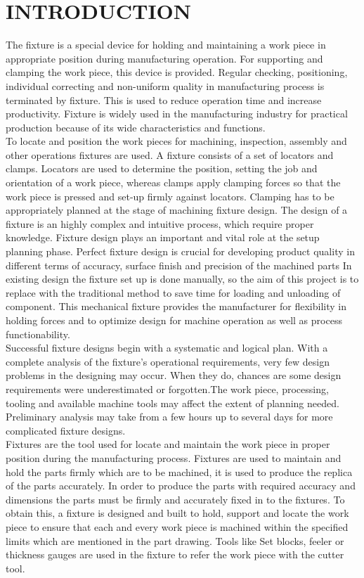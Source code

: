 \documentclass[16pt,a4paper]{article}
\begin{document}
\pagebreak

\section{INTRODUCTION}
The fixture is a special device for holding and maintaining a work piece in appropriate position during manufacturing operation. For supporting and clamping the work piece, this device is provided. Regular   checking, positioning, individual correcting and non-uniform quality in manufacturing process is terminated by fixture. This is used to reduce operation time and increase productivity. Fixture is widely used in the manufacturing industry for practical production because of its wide characteristics and functions. 
\\ To locate and position the work pieces for machining, inspection, assembly and other operations fixtures are used. A fixture consists of a set of locators and clamps. Locators are used to determine the position, setting the job and orientation of a work piece, whereas clamps apply clamping forces so that the work piece is pressed and set-up firmly against locators. Clamping has to be appropriately planned at the stage of machining fixture design. The design of a fixture is an highly complex and intuitive process, which require proper knowledge. Fixture design plays an important and vital role at the setup planning phase. Perfect fixture design is crucial for developing product quality in   different terms of accuracy, surface finish and precision of the machined parts In existing design the fixture set up is done manually, so the aim of this project is to replace with the traditional method to save time for loading and unloading of component. This mechanical fixture provides the manufacturer for flexibility in holding forces and to optimize design for machine operation as well as process functionability.
\\Successful fixture designs begin with a systematic and logical plan. With a complete analysis of the fixture's operational requirements, very few design problems in the designing may occur.  When they do, chances are some design requirements were underestimated or forgotten.The  work piece,  processing,  tooling  and  available  machine  tools  may  affect  the  extent  of  planning  needed. Preliminary analysis may take from a few hours up to several days for more complicated fixture designs.
\\ Fixtures are the tool used for locate and maintain the work piece in proper position during the manufacturing process. Fixtures are used to maintain and hold the parts firmly which are to be machined, it is used to produce the replica of the parts accurately. In order to produce the parts with required accuracy and dimensions the parts must be firmly and accurately fixed in to the fixtures. To obtain this, a fixture is designed and built to hold, support and locate the work piece to ensure that each and every work piece is machined within the specified limits which are mentioned in the part drawing. Tools like Set blocks, feeler or thickness gauges are used in the fixture to refer the work piece with the cutter tool. 
\end{document}
